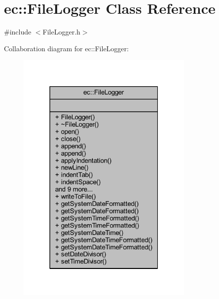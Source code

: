 \hypertarget{classec_1_1_file_logger}{}\section{ec\+:\+:File\+Logger Class Reference}
\label{classec_1_1_file_logger}


{\ttfamily \#include $<$File\+Logger.\+h$>$}



Collaboration diagram for ec\+:\+:File\+Logger\+:\nopagebreak
\begin{figure}[H]
\begin{center}
\leavevmode
\includegraphics[width=244pt]{classec_1_1_file_logger__coll__graph}
\end{center}
\end{figure}

